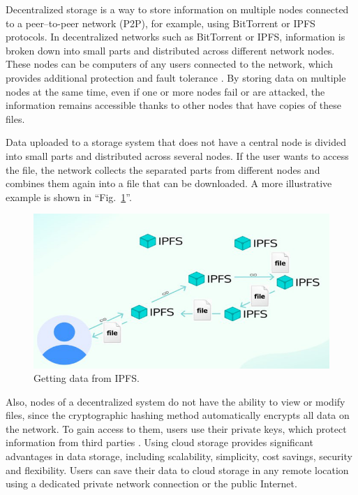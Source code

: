\documentclass[10pt,conference,a4paper]{IEEEtran_EDM}
\begin{document}
Decentralized storage is a way to store information on multiple nodes connected to a peer–to-peer network (P2P), for example, using BitTorrent or IPFS \cite{IPFS} protocols.
In decentralized networks such as BitTorrent or IPFS, information is broken down into small parts and distributed across different network nodes.
These nodes can be computers of any users connected to the network, which provides additional protection and fault tolerance \cite{Anisimov}.
By storing data on multiple nodes at the same time, even if one or more nodes fail or are attacked, the information remains accessible thanks to other nodes that have copies of these files.

Data uploaded to a storage system that does not have a central node is divided into small parts and distributed across several nodes. If the user wants to access the file, the network collects the separated parts from different nodes and combines them again into a file that can be downloaded. A more illustrative example is shown in ``Fig.~\ref{data_IPFS}''.

\begin{figure}[htbp]
\centerline{\includegraphics[scale=0.71]{fig1.png}}
\caption{Getting data from IPFS.}
\label{data_IPFS}
\end{figure}

Also, nodes of a decentralized system do not have the ability to view or modify files, since the cryptographic hashing method automatically encrypts all data on the network.
To gain access to them, users use their private keys, which protect information from third parties \cite{Web3Browsers}.
Using cloud storage provides significant advantages in data storage, including scalability, simplicity, cost savings, security and flexibility.
Users can save their data to cloud storage in any remote location using a dedicated private network connection or the public Internet.
\end{document}
